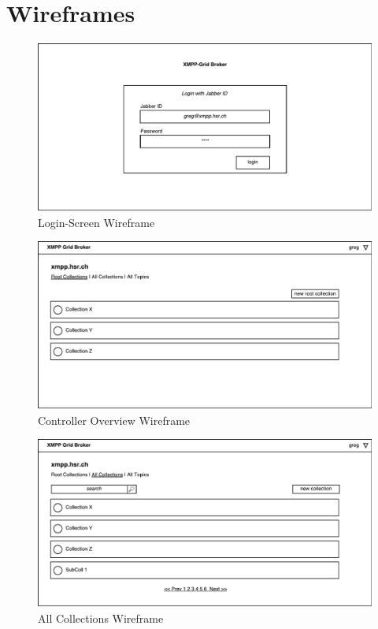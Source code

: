 
\section{Wireframes}\label{sec:wireframes}

\begin{figure}[h]
    \centering
    \includegraphics[width=1\linewidth]{resources/wireframe_1}
    \caption{Login-Screen Wireframe}
\end{figure}

\begin{figure}[h]
    \centering
    \includegraphics[width=1\linewidth]{resources/wireframe_2}
    \caption{Controller Overview Wireframe}
\end{figure}

\begin{figure}[h]
    \centering
    \includegraphics[width=1\linewidth]{resources/wireframe_3}
    \caption{All Collections Wireframe}
\end{figure}

